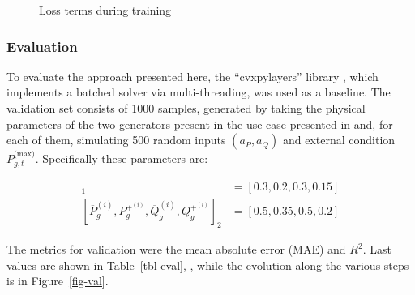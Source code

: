 \documentclass[
]{article}
\begin{document}
\begin{figure}


\caption{\label{fig-training}Loss terms during training}

\end{figure}%

\subsubsection{Evaluation}\label{evaluation}

To evaluate the approach presented here, the ``cvxpylayers'' library
\autocite{agrawalDifferentiableConvexOptimization2019a}, which
implements a batched solver via multi-threading, was used as a baseline.
The validation set consists of 1000 samples, generated by taking the
physical parameters of the two generators present in the use case
presented in \autocite{henryGymANMReinforcementLearning2021} and, for
each of them, simulating 500 random inputs \((a_P, a_Q)\) and external
condition \(P^{\textrm{(max)}}_{g,t}\). Specifically these parameters
are:

\begin{align}
    [\overline{P}_g^{(i)},  P_g^{+^{(i)}}, \overline{Q}_g^{(i)},  Q_g^{+^{(i)}}]_1 &= [0.3, 0.2, 0.3, 0.15]\\
    [\overline{P}_g^{(i)},  P_g^{+^{(i)}}, \overline{Q}_g^{(i)},  Q_g^{+^{(i)}}]_2 &= [0.5, 0.35, 0.5, 0.2]
\end{align}

The metrics for validation were the mean absolute error (MAE) and
\(R^2\). Last values are shown in Table~\ref{tbl-eval}, , while the
evolution along the various steps is in Figure~\ref{fig-val}.
\end{document}

